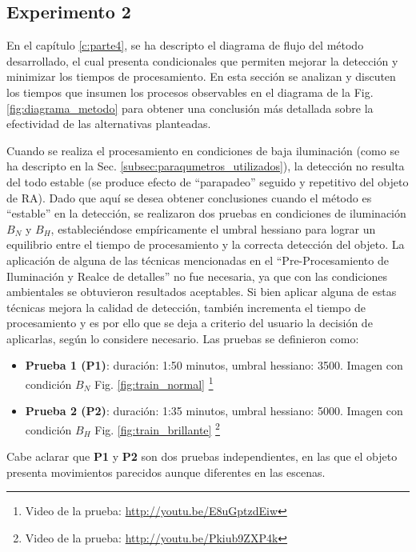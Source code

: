\subsection{Experimento 2}
En el capítulo \ref{c:parte4}, se ha descripto el diagrama de flujo del método desarrollado, el cual presenta condicionales que permiten mejorar la detección y minimizar los tiempos de procesamiento. En esta sección se analizan y discuten los tiempos que insumen los procesos observables en el diagrama de la Fig. \ref{fig:diagrama_metodo} para obtener una conclusión más detallada sobre la efectividad de las alternativas planteadas.

Cuando se realiza el procesamiento en condiciones de baja iluminación (como se ha descripto en la Sec. \ref{subsec:paraqumetros_utilizados}), la detección no resulta del todo estable (se produce efecto de ``parapadeo'' seguido y repetitivo del objeto de RA). Dado que aquí se desea obtener conclusiones cuando el método es ``estable'' en la detección, se realizaron dos pruebas en condiciones de iluminación $B_{N}$ y $B_{H}$, estableciéndose empíricamente el umbral hessiano para lograr un equilibrio entre el tiempo de procesamiento y la correcta detección del objeto. La aplicación de alguna de las técnicas mencionadas en el ``Pre-Procesamiento de Iluminación y Realce de detalles'' no fue necesaria, ya que con las condiciones ambientales se obtuvieron resultados aceptables. Si bien aplicar alguna de estas técnicas mejora la calidad de detección, también incrementa el tiempo de procesamiento y es por ello que se deja a criterio del usuario la decisión de aplicarlas, según lo considere necesario. Las pruebas se definieron como:
\begin{itemize}
 \item \textbf{Prueba 1 (P1)}: duración: 1:50 minutos, umbral hessiano: 3500. Imagen con condición $B_{N}$ Fig. \ref{fig:train_normal} \footnote{Video de la prueba: \url{http://youtu.be/E8uGptzdEiw}}
 \item \textbf{Prueba 2 (P2)}: duración: 1:35 minutos, umbral hessiano: 5000. Imagen con condición $B_{H}$ Fig. \ref{fig:train_brillante} \footnote{Video de la prueba: \url{http://youtu.be/Pkiub9ZXP4k}}
\end{itemize}
Cabe aclarar que \textbf{P1} y \textbf{P2} son dos pruebas independientes, en las que el objeto presenta movimientos parecidos aunque diferentes en las escenas.

